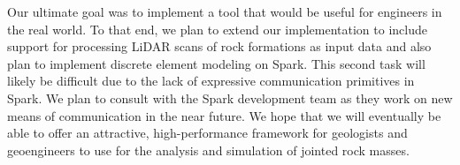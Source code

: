 Our ultimate goal was to implement a tool that would be useful for engineers in the real world. To that end, we plan to extend our implementation to include support for processing LiDAR scans of rock formations as input data and also plan to implement discrete element modeling on Spark. This second task will likely be difficult due to the lack of expressive communication primitives in Spark. We plan to consult with the Spark development team as they work on new means of communication in the near future. We hope that we will eventually be able to offer an attractive, high-performance framework for geologists and geoengineers to use for the analysis and simulation of jointed rock masses.